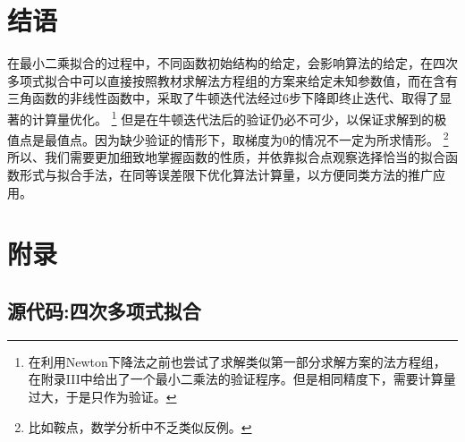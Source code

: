 \documentclass[UTF8]{ctexart}
\begin{document}
\section{结语}
在最小二乘拟合的过程中，不同函数初始结构的给定，会影响算法的给定，在四次多项式拟合中可以直接按照教材求解法方程组的方案来给定未知参数值，而在含有三角函数的非线性函数中，采取了牛顿迭代法经过6步下降即终止迭代、取得了显著的计算量优化。
\footnote[1]{在利用Newton下降法之前也尝试了求解类似第一部分求解方案的法方程组，在附录III中给出了一个最小二乘法的验证程序。但是相同精度下，需要计算量过大，于是只作为验证。}
但是在牛顿迭代法后的验证仍必不可少，以保证求解到的极值点是最值点。因为缺少验证的情形下，取梯度为0的情况不一定为所求情形。
\footnote[2]{比如鞍点，数学分析中不乏类似反例。}
所以、我们需要更加细致地掌握函数的性质，并依靠拟合点观察选择恰当的拟合函数形式与拟合手法，在同等误差限下优化算法计算量，以方便同类方法的推广应用。

\newpage
\begin{thebibliography}{99}
\end{thebibliography}

\section{附录}

\subsection{源代码:四次多项式拟合}
\end{document}
